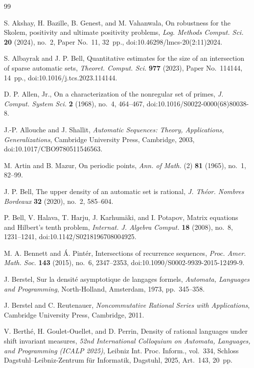 \begin{thebibliography}{99}

S. Akshay, H. Bazille, B. Genest, and M. Vahanwala,
On robustness for the Skolem, positivity and ultimate positivity problems,
\textit{Log. Methods Comput. Sci.} \textbf{20} (2024), no.~2,
Paper No.~11, 32~pp.,
doi:10.46298/lmcs-20(2:11)2024.

S. Albayrak and J. P. Bell,
Quantitative estimates for the size of an intersection of sparse automatic sets,
\textit{Theoret. Comput. Sci.} \textbf{977} (2023), Paper No.~114144,
14~pp., doi:10.1016/j.tcs.2023.114144.

D. P. Allen, Jr.,
On a characterization of the nonregular set of primes,
\textit{J. Comput. System Sci.} \textbf{2} (1968), no.~4, 464--467,
doi:10.1016/S0022-0000(68)80038-8.

J.-P. Allouche and J. Shallit,
\textit{Automatic Sequences: Theory, Applications, Generalizations},
Cambridge University Press, Cambridge, 2003,
doi:10.1017/CBO9780511546563.

M. Artin and B. Mazur,
On periodic points,
\textit{Ann. of Math.} (2) \textbf{81} (1965), no.~1, 82--99.

J. P. Bell,
The upper density of an automatic set is rational,
\textit{J. Th{\'e}or. Nombres Bordeaux} \textbf{32} (2020), no.~2, 585--604.

P. Bell, V. Halava, T. Harju, J. Karhum\"aki, and I. Potapov,
Matrix equations and Hilbert's tenth problem,
\textit{Internat. J. Algebra Comput.} \textbf{18} (2008), no.~8,
1231--1241, doi:10.1142/S0218196708004925.

M. A. Bennett and \'A. Pint\'er,
Intersections of recurrence sequences,
\textit{Proc. Amer. Math. Soc.} \textbf{143} (2015), no.~6, 2347--2353,
doi:10.1090/S0002-9939-2015-12499-9.

J. Berstel,
Sur la densit\'e asymptotique de langages formels,
\textit{Automata, Languages and Programming},
North-Holland, Amsterdam, 1973, pp.~345--358.

J. Berstel and C. Reutenauer,
\textit{Noncommutative Rational Series with Applications},
Cambridge University Press, Cambridge, 2011.

V. Berth{\'e}, H. Goulet-Ouellet, and D. Perrin,
Density of rational languages under shift invariant measures,
\textit{52nd International Colloquium on Automata, Languages, and Programming
(ICALP 2025)}, Leibniz Int. Proc. Inform., vol.~334,
Schloss Dagstuhl--Leibniz-Zentrum f\"ur Informatik, Dagstuhl, 2025,
Art.~143, 20~pp.


\end{thebibliography}
